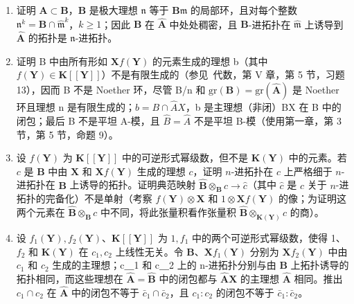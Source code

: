 \begin{enumerate}
\def\labelenumi{(\alph{enumi})}
\item
  证明 \(\mathbf{A} \subset \mathbf{B}\)，\(\mathbf{B}\) 是极大理想 \(\mathfrak{n}\) 等于 \(\mathbf{B}\mathfrak{m}\) 的局部环，且对每个整数 \(\mathfrak{n}^k = \mathbf{B} \cap \hat{\mathfrak{m}}^k\)，\(k \geqslant 1\)；因此 \(\mathbf{B}\) 在 \(\hat{\mathbf{A}}\) 中处处稠密，且 \(\mathbf{B}\)-进拓扑在 \(\hat{\mathfrak{m}}\) 上诱导到 \(\hat{\mathbf{A}}\) 的拓扑是 \(\mathfrak{n}\)-进拓扑。
\item
  证明 B 中由所有形如 \(\mathbf{X}f(\mathbf{Y})\) 的元素生成的理想 b（其中 \(f(\mathbf{Y}) \in \mathbf{K}[[\mathbf{Y}]]\)）不是有限生成的（参见~代数，第 V 章，第 5 节，习题 13），因而 B 不是 Noether 环，尽管 B/n 和 \(\mathrm{gr}(\mathbf{B}) = \mathrm{gr}(\hat{\mathbf{A}})\) 是 Noether 环且理想 n 是有限生成的；\(b = B \cap \hat{A}X\)，b 是主理想（非闭）BX 在 B 中的闭包；最后 B 不是平坦 A-模，且 \(\hat{B} = \hat{A}\) 不是平坦 B-模（使用第一章，第 3 节，第 5 节，命题 9）。
\item
   设 \(f(\mathbf{Y})\) 为 \(\mathbf{K}[[\mathbf{Y}]]\) 中的可逆形式幂级数，但不是 \(\mathbf{K}(\mathbf{Y})\) 中的元素。若 \(c\) 是 \(\mathbf{B}\) 中由 \(\mathbf{X}\) 和 \(\mathbf{X}f(\mathbf{Y})\) 生成的理想 \(c\)，证明 \(n\)-进拓扑在 \(c\) 上严格细于 \(n\)-进拓扑在 \(\mathbf{B}\) 上诱导的拓扑。证明典范映射 \(\hat{\mathbf{B}} \otimes_{\mathbf{B}} c \to \hat{c}\)（其中 \(\hat{c}\) 是 \(c\) 关于 \(n\)-进拓扑的完备化）不是单射（考察 \(f(\mathbf{Y}) \otimes \mathbf{X}\) 和 \(1 \otimes \mathbf{X}f(\mathbf{Y})\) 的像；为证明这两个元素在 \(\hat{\mathbf{B}} \otimes_{\mathbf{B}} c\) 中不同，将此张量积看作张量积 \(\hat{\mathbf{B}} \otimes_{\mathbf{K}(\mathbf{Y})} c\) 的商）。
\item
  设 \(f_{1}(\mathbf{Y}), f_{2}(\mathbf{Y})\)、\(\mathbf{K}[[\mathbf{Y}]]\) 为 \(1, f_{1}\) 中的两个可逆形式幂级数，使得 1、\(f_{2}\) 和 \(\mathbf{K}(\mathbf{Y})\) 在 \(c_{1}, c_{2}\) 上线性无关。令 \(\mathbf{B}\)、\(\mathbf{X}f_{1}(\mathbf{Y})\) 分别为 \(\mathbf{X}f_{2}(\mathbf{Y})\) 中由 \(c_{1}\) 和 \(c_{2}\) 生成的主理想；c＿1 和 c＿2 上的 n-进拓扑分别与由 \(\mathbf{B}\) 上拓扑诱导的拓扑相同，而这些理想在 \(\hat{\mathbf{A}} = \hat{\mathbf{B}}\) 中的闭包都与 \(\hat{\mathbf{A}}\mathbf{X}\) 的主理想 \(\hat{\mathbf{A}}\) 相同。推出 \(c_{1} \cap c_{2}\) 在 \(\hat{\mathbf{A}}\) 中的闭包不等于 \(\bar{c}_{1} \cap \bar{c}_{2}\)，且 \(c_{1}: c_{2}\) 的闭包不等于 \(\bar{c}_{1}: \bar{c}_{2}\)。
\end{enumerate}

